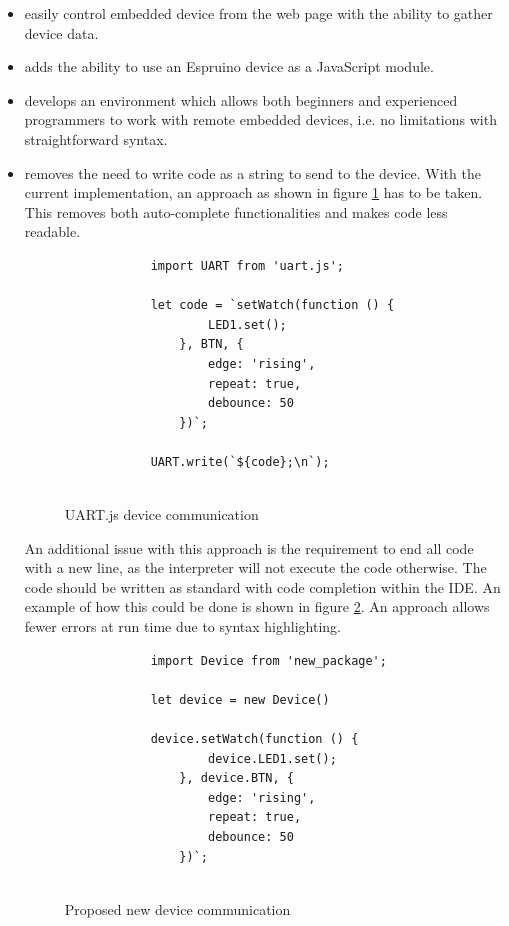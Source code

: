 \documentclass{l4proj}
\begin{document}
\begin{itemize}
    \item easily control embedded device from the web page with the ability to gather device data.
    \item adds the ability to use an Espruino device as a JavaScript module.
    \item develops an environment which allows both beginners and experienced programmers to work with remote embedded devices, i.e. no limitations with straightforward syntax.
    \item removes the need to write code as a string to send to the device. With the current implementation, an approach as shown in figure \ref{fig:OLD_UART_DEVICE_WRITING_CODE} has to be taken. This removes both auto-complete functionalities and makes code less readable.

    \begin{figure}[!ht]
        \begin{lstlisting}
            import UART from 'uart.js';
        
            let code = `setWatch(function () {
                    LED1.set();
                }, BTN, {
                    edge: 'rising',
                    repeat: true,
                    debounce: 50
                })`;

            UART.write(`${code};\n`);
            
        \end{lstlisting}
        \caption{UART.js device communication}
        \label{fig:OLD_UART_DEVICE_WRITING_CODE}
    \end{figure}

     An additional issue with this approach is the requirement to end all code with a new line, as the interpreter will not execute the code otherwise. The code should be written as standard with code completion within the IDE. An example of how this could be done is shown in figure \ref{fig:NEW_DEVICE_WRITING_CODE}. An approach allows fewer errors at run time due to syntax highlighting. 

     \begin{figure}[!ht]
        \begin{lstlisting}
            import Device from 'new_package';

            let device = new Device()
        
            device.setWatch(function () {
                    device.LED1.set();
                }, device.BTN, {
                    edge: 'rising',
                    repeat: true,
                    debounce: 50
                })`;
            
        \end{lstlisting}
        \caption{Proposed new device communication}
        \label{fig:NEW_DEVICE_WRITING_CODE}
    \end{figure}
\end{itemize}
\end{document}
